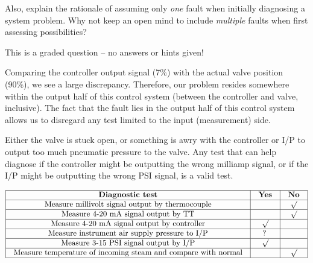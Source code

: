 Also, explain the rationale of assuming only {\it one} fault when initially diagnosing a system problem.  Why not keep an open mind to include {\it multiple} faults when first assessing possibilities?

\vfil

\eject






This is a graded question -- no answers or hints given!







Comparing the controller output signal (7\%) with the actual valve position (90\%), we see a large discrepancy.  Therefore, our problem resides somewhere within the output half of this control system (between the controller and valve, inclusive).  The fact that the fault lies in the output half of this control system allows us to disregard any test limited to the input (measurement) side.

\vskip 10pt

Either the valve is stuck open, or something is awry with the controller or I/P to output too much pneumatic pressure to the valve.  Any test that can help diagnose if the controller might be outputting the wrong milliamp signal, or if the I/P might be outputting the wrong PSI signal, is a valid test.


$$\vbox{\offinterlineskip
\halign{\strut
\vrule \quad\hfil # \ \hfil & 
\vrule \quad\hfil # \ \hfil & 
\vrule \quad\hfil # \ \hfil \vrule \cr
\noalign{\hrule}
%
{\bf Diagnostic test} & {\bf Yes} & {\bf No} \cr
%
\noalign{\hrule}
%
Measure millivolt signal output by thermocouple &  & $\surd$ \cr
%
\noalign{\hrule}
%
Measure 4-20 mA signal output by TT &  & $\surd$ \cr
%
\noalign{\hrule}
%
Measure 4-20 mA signal output by controller & $\surd$ &  \cr
%
\noalign{\hrule}
%
Measure instrument air supply pressure to I/P & ? &  \cr
%
\noalign{\hrule}
%
Measure 3-15 PSI signal output by I/P & $\surd$ &  \cr
%
\noalign{\hrule}
%
Measure temperature of incoming steam and compare with normal &  & $\surd$ \cr
%
\noalign{\hrule}
} %
}$$ %

